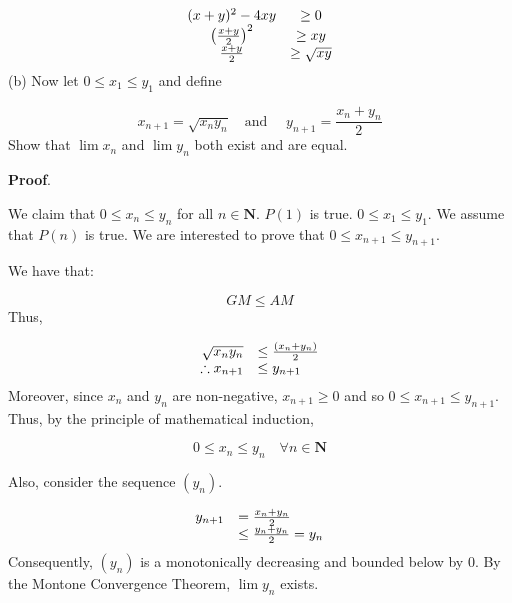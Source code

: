 \documentclass[10pt]{article}
\begin{document}
\begin{equation*}
\begin{array}{ c c }
( x+y)^{2} -4xy & \geq 0\\
\left(\frac{x+y}{2}\right)^{2} & \geq xy\\
\frac{x+y}{2} & \geq \sqrt{xy}
\end{array}
\end{equation*}
(b) Now let $\displaystyle 0\leq x_{1} \leq y_{1}$ and define 


\begin{equation*}
x_{n+1} =\sqrt{x_{n} y_{n}} \quad \text{and } \quad y_{n+1} =\frac{x_{n} +y_{n}}{2}
\end{equation*}
Show that $\displaystyle \lim x_{n}$ and $\displaystyle \lim y_{n}$ both exist and are equal.



\textbf{Proof}.



We claim that $\displaystyle 0\leq x_{n} \leq y_{n}$ for all $\displaystyle n\in \mathbf{N}$. $\displaystyle P( 1)$ is true. $\displaystyle 0\leq x_{1} \leq y_{1}$. We assume that $\displaystyle P( n)$ is true. We are interested to prove that $\displaystyle 0\leq x_{n+1} \leq y_{n+1}$. 



We have that:


\begin{equation*}
GM\leq AM
\end{equation*}
Thus,


\begin{equation*}
\begin{array}{ r l }
\sqrt{x_{n} y_{n}} & \leq \frac{( x_{n} +y_{n})}{2}\\
\therefore x_{n+1} & \leq y_{n+1}
\end{array}
\end{equation*}
Moreover, since $\displaystyle x_{n}$ and $\displaystyle y_{n}$ are non-negative, $\displaystyle x_{n+1} \geq 0$ and so $\displaystyle 0\leq x_{n+1} \leq y_{n+1}$. Thus, by the principle of mathematical induction, 


\begin{equation*}
0\leq x_{n} \leq y_{n} \quad \forall n\in \mathbf{N}
\end{equation*}


Also, consider the sequence $\displaystyle ( y_{n})$. 


\begin{equation*}
\begin{array}{ c l }
y_{n+1} & =\frac{x_{n} +y_{n}}{2}\\
 & \leq \frac{y_{n} +y_{n}}{2} =y_{n}
\end{array}
\end{equation*}
Consequently, $\displaystyle ( y_{n})$ is a monotonically decreasing and bounded below by $\displaystyle 0$. By the Montone Convergence Theorem, $\displaystyle \lim y_{n}$ exists.
\end{document}
